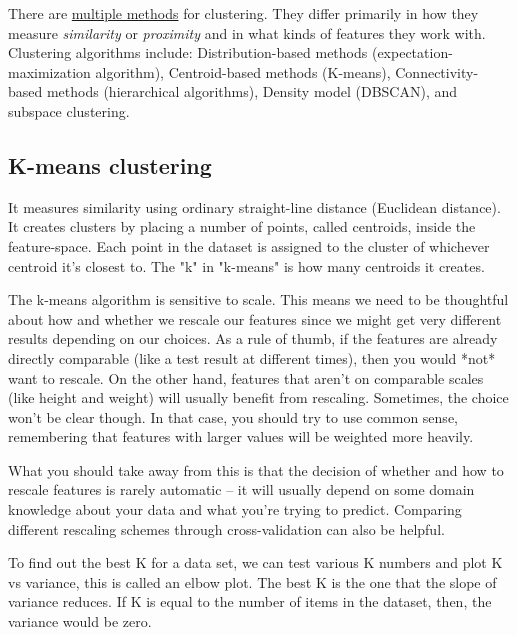 \documentclass[12pt]{report}
\begin{document}
There are \href{https://www.geeksforgeeks.org/different-types-clustering-algorithm/#}{multiple methods} for clustering. They differ primarily in how they measure \textit{similarity} or \textit{proximity} and in what kinds of features they work with. Clustering algorithms include: Distribution-based methods (expectation-maximization algorithm), Centroid-based methods (K-means), Connectivity-based methods (hierarchical algorithms), Density model (DBSCAN), and subspace clustering.

\subsection{K-means clustering}
It measures similarity using ordinary straight-line distance (Euclidean distance). It creates clusters by placing a number of points, called centroids, inside the feature-space. Each point in the dataset is assigned to the cluster of whichever centroid it's closest to. The "k" in "k-means" is how many centroids it creates.

The k-means algorithm is sensitive to scale. This means we need to be thoughtful about how and whether we rescale our features since we might get very different results depending on our choices. As a rule of thumb, if the features are already directly comparable (like a test result at different times), then you would *not* want to rescale. On the other hand, features that aren't on comparable scales (like height and weight) will usually benefit from rescaling. Sometimes, the choice won't be clear though. In that case, you should try to use common sense, remembering that features with larger values will be weighted more heavily.

What you should take away from this is that the decision of whether and how to rescale features is rarely automatic -- it will usually depend on some domain knowledge about your data and what you're trying to predict. Comparing different rescaling schemes through cross-validation can also be helpful.

To find out the best K for a data set, we can test various K numbers and plot K vs variance, this is called an elbow plot. The best K is the one that the slope of variance reduces. If K is equal to the number of items in the dataset, then, the variance would be zero.
\end{document}

